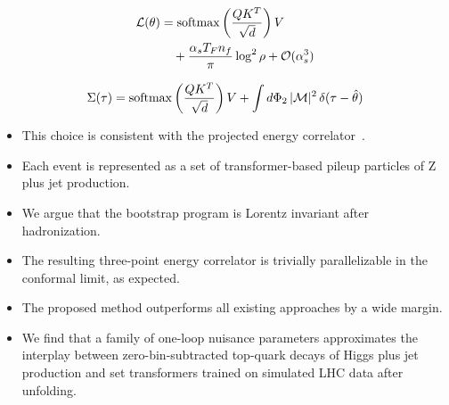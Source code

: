 \begin{align}
  \mathcal{L}(\theta) &= \mathrm{softmax}\left(\frac{Q K^T}{\sqrt{d}}\right) V \nonumber \\
  &\quad + \frac{\alpha_s T_F n_f}{\pi} \log^2 \rho + \mathcal{O}(\alpha_s^3) \label{eq:4}
\end{align}

\begin{equation}
  \Sigma(\tau) = \mathrm{softmax}\left(\frac{Q K^T}{\sqrt{d}}\right) V + \int d\Phi_{2} \, |\mathcal{M}|^2 \, \delta(\tau - \hat{\theta})
  \label{eq:6}
\end{equation}

\begin{itemize}
  \item This choice is consistent with the projected energy correlator~\cite{TPC:0060-Event-Reconstruction-with-Large-Language-Models-A-No-Go-Theorem-September-26-2026}.
  \item Each event is represented as a set of transformer-based pileup particles of Z plus jet production.
  \item We argue that the bootstrap program is Lorentz invariant after hadronization.
\end{itemize}

\begin{itemize}
  \item The resulting three-point energy correlator is trivially parallelizable in the conformal limit, as expected.
  \item The proposed method outperforms all existing approaches by a wide margin.
  \item We find that a family of one-loop nuisance parameters approximates the interplay between zero-bin-subtracted top-quark decays of Higgs plus jet production and set transformers trained on simulated LHC data after unfolding.
\end{itemize}

